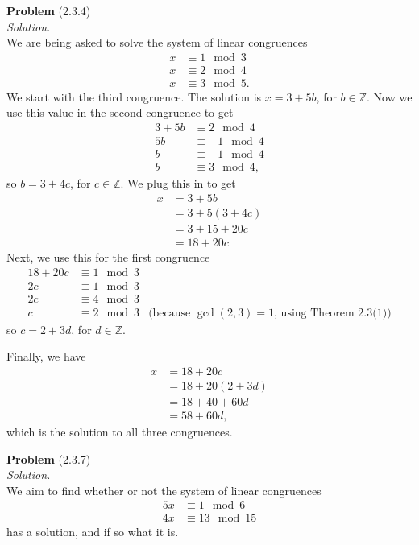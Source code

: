 \documentclass[12 pt]{amsart}
\begin{document}
\phantom{\quad} \vfill
\noindent
\textbf{Problem} (2.3.4) \\[4ex]
\emph{Solution.} \\[2ex]
  We are being asked to solve the system of linear congruences
  \begin{align*}
    x &\equiv 1 \mod 3 \\
    x &\equiv 2 \mod 4 \\
    x &\equiv 3 \mod 5.
  \end{align*}
  We start with the third congruence.
  The solution is $x = 3 + 5b$, for $b \in \mathbb{Z}$.
  Now we use this value in the second congruence to get
  \begin{align*}
    3 + 5b &\equiv 2 \mod 4 \\
    5 b &\equiv -1 \mod 4 \\
    b &\equiv -1 \mod 4 \\
    b &\equiv 3 \mod 4,
  \end{align*}
  so $b = 3 + 4c$, for $c \in \mathbb{Z}$. 
  We plug this in to get
  \begin{align*}
    x &= 3 + 5b  \\
      &= 3 + 5(3 + 4c) \\
      &= 3 + 15 + 20c \\
      &= 18 + 20c
  \end{align*}
   Next, we use this for the first congruence
  \begin{align*}
    18 + 20c &\equiv 1 \mod 3 \\
    2c &\equiv 1 \mod 3 \\
    2c &\equiv 4 \mod 3 \\
    c &\equiv 2 \mod 3 & \text{(because $\gcd(2, 3) = 1$, using Theorem 2.3(1))}
  \end{align*}
  so $c = 2 + 3d$, for $d \in \mathbb{Z}$.
 
  Finally, we have
  \begin{align*}
    x &= 18 + 20c \\
      &= 18 + 20(2 + 3d) \\
      &= 18 + 40 + 60d \\
      &= 58 + 60d,
  \end{align*}
  which is the solution to all three congruences.
\vfill
\newpage



\phantom{\quad} \vfill
\noindent
\textbf{Problem} (2.3.7) \\[4ex]
\emph{Solution.} \\[2ex]
  We aim to find whether or not the system of linear
  congruences
  \begin{align*}
    5x &\equiv 1 \mod 6 \\
    4x &\equiv 13 \mod 15
  \end{align*}
  has a solution, and if so what it is. 
\end{document}
